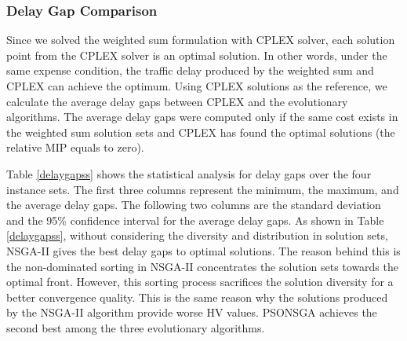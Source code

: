 \documentclass[10pt,journal,compsoc]{IEEEtran}
\newcommand{\Fig}[1]{Fig.~\ref{#1}}
\begin{document}
\subsubsection{Delay Gap Comparison}
Since we solved the weighted sum formulation with CPLEX solver, each solution point from the CPLEX solver is an optimal solution. In other words, under the same expense condition, the traffic delay produced by the weighted sum and CPLEX can achieve the optimum. Using CPLEX solutions as the reference, we calculate the average delay gaps between CPLEX and the evolutionary algorithms. The average delay gaps were computed only if the same cost exists in the weighted sum solution sets and CPLEX has found the optimal solutions (the relative MIP equals to zero). 

Table \ref{delaygapss} shows the statistical analysis for delay gaps over the four instance sets. The first three columns represent the minimum, the maximum, and the average delay gaps. The following two columns are the standard deviation and the 95\% confidence interval for the average delay gaps. As shown in Table \ref{delaygapss}, without considering the diversity and distribution in solution sets, NSGA-II gives the best delay gaps to optimal solutions. The reason behind this is the non-dominated sorting in NSGA-II concentrates the solution sets towards the optimal front. However, this sorting process sacrifices the solution diversity for a better convergence quality. This is the same reason why the solutions produced by the NSGA-II algorithm provide worse HV values. PSONSGA achieves the second best among the three evolutionary algorithms.
\end{document}
